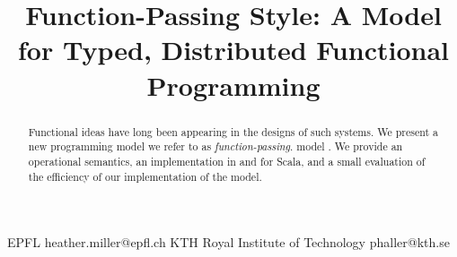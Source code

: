 \documentclass[preprint]{sigplanconf}
\theoremstyle{definition}
\theoremstyle{definition}
\begin{document}
\setlength{\pdfpageheight}{\paperheight}
\setlength{\pdfpagewidth}{\paperwidth}

\setmainfont[Mapping=tex-text]{Times New Roman}
\setmonofont[Scale=0.8,BoldFont={Consolas Bold}]{Consolas}






\title{Function-Passing Style: A Model for Typed, Distributed Functional Programming}

           {EPFL}
           {heather.miller@epfl.ch}
           {KTH Royal Institute of Technology}
           {phaller@kth.se}

\maketitle

\begin{abstract}
Functional ideas have long
been appearing in the designs of such systems. We present a new programming
model we refer to as {\em function-passing}. model . We provide an operational
semantics, an implementation in and for Scala, and a small evaluation of the
efficiency of our implementation of the model.

\end{abstract}

\end{document}
